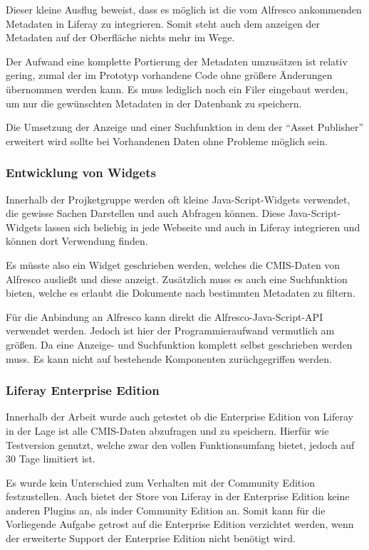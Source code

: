 Dieser kleine Ausflug beweist, dass es m\"oglich ist die vom Alfresco ankommenden Metadaten in Liferay zu integrieren. Somit steht auch dem anzeigen der Metadaten auf der Oberfl\"ache nichts mehr im Wege. \cite{Chemistry_examples}

Der Aufwand eine komplette Portierung der Metadaten umzus\"atzen ist relativ gering, zumal der im Prototyp vorhandene Code ohne gr\"o\ss{}ere \"Anderungen \"ubernommen werden kann. Es muss lediglich noch ein Filer eingebaut werden, um nur die gew\"unschten Metadaten in der Datenbank zu speichern.

Die Umsetzung der Anzeige und einer Suchfunktion in dem der "`Asset Publisher"' erweitert wird sollte bei Vorhandenen Daten ohne Probleme m\"oglich sein.
\subsubsection{Entwicklung von Widgets}\label{Liferay Widget}
Innerhalb der Projketgruppe werden oft kleine Java-Script-Widgets verwendet, die gewisse Sachen Darstellen und auch Abfragen k\"onnen. 
Diese Java-Script-Widgets lassen sich beliebig in jede Webseite und auch in Liferay integrieren und k\"onnen dort Verwendung finden.

Es m\"usste also ein Widget geschrieben werden, welches die \ac{CMIS}-Daten von Alfresco auslie\ss{}t und diese anzeigt. Zus\"atzlich muss es auch eine Suchfunktion bieten, welche es erlaubt die Dokumente nach bestimmten Metadaten zu filtern.

F\"ur die Anbindung an Alfresco kann direkt die Alfresco-Java-Script-\ac{API} verwendet werden. Jedoch ist hier der Programmieraufwand vermutlich am gr\"o\ss{}en. Da eine Anzeige- und Suchfunktion komplett selbst geschrieben werden muss. Es kann nicht auf bestehende Komponenten zur\"uchgegriffen werden.

\subsubsection{Liferay Enterprise Edition}
Innerhalb der Arbeit wurde auch getestet ob die Enterprise Edition von Liferay in der Lage ist alle \ac{CMIS}-Daten abzufragen und zu speichern. Hierf\"ur wie Testversion genutzt, welche zwar den vollen Funktionsumfang bietet, jedoch auf 30 Tage limitiert ist.

Es wurde kein Unterschied zum Verhalten mit der Community Edition festzustellen. Auch bietet der Store von Liferay in der Enterprise Edition keine anderen Plugins an, als inder Community Edition an. Somit kann f\"ur die Vorliegende Aufgabe getrost auf die Enterprise Edition verzichtet werden, wenn der erweiterte Support der Enterprise Edition nicht ben\"otigt wird.

